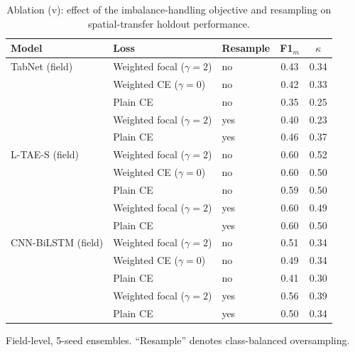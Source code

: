 \documentclass[journal]{IEEEtran}
\begin{document}
\begin{table}[!t]
\centering
\scriptsize
\caption{Ablation (v): effect of the imbalance-handling objective and resampling on spatial-transfer
holdout performance.}
\label{stab:loss}
\renewcommand{\arraystretch}{1.12}
\setlength{\tabcolsep}{8pt}
\begin{tabular}{lllcc}
\toprule
\textbf{Model} & \textbf{Loss} & \textbf{Resample} & \textbf{F1$_m$} & \textbf{$\kappa$} \\
\midrule
TabNet (field)     & Weighted focal ($\gamma{=}2$) & no  & 0.43 & 0.34 \\
                   & Weighted CE ($\gamma{=}0$)    & no  & 0.42 & 0.33 \\
                   & Plain CE                       & no  & 0.35 & 0.25 \\
                   & Weighted focal ($\gamma{=}2$) & yes & 0.40 & 0.23 \\
                   & Plain CE                       & yes & 0.46 & 0.37 \\
\midrule
L-TAE-S (field)    & Weighted focal ($\gamma{=}2$) & no  & 0.60 & 0.52 \\
                   & Weighted CE ($\gamma{=}0$)    & no  & 0.60 & 0.50 \\
                   & Plain CE                       & no  & 0.59 & 0.50 \\
                   & Weighted focal ($\gamma{=}2$) & yes & 0.60 & 0.49 \\
                   & Plain CE                       & yes & 0.60 & 0.50 \\
\midrule
CNN-BiLSTM (field) & Weighted focal ($\gamma{=}2$) & no  & 0.51 & 0.34 \\
                   & Weighted CE ($\gamma{=}0$)    & no  & 0.49 & 0.34 \\
                   & Plain CE                       & no  & 0.41 & 0.30 \\
                   & Weighted focal ($\gamma{=}2$) & yes & 0.56 & 0.39 \\
                   & Plain CE                       & yes & 0.50 & 0.34 \\
\bottomrule
\end{tabular}
\par\vspace{3pt}
\begin{minipage}{\columnwidth}
\footnotesize
Field-level, 5-seed ensembles. ``Resample'' denotes class-balanced oversampling.
\end{minipage}
\end{table}
\end{document}
